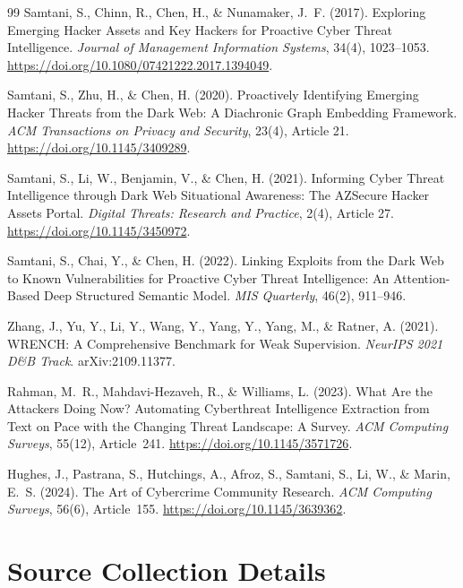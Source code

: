 \documentclass{article}
\begin{document}
\begin{thebibliography}{99}
Samtani, S., Chinn, R., Chen, H., \& Nunamaker, J.\ F. (2017).
Exploring Emerging Hacker Assets and Key Hackers for Proactive Cyber
Threat Intelligence. \textit{Journal of Management Information Systems},
34(4), 1023--1053. \url{https://doi.org/10.1080/07421222.2017.1394049}.

Samtani, S., Zhu, H., \& Chen, H. (2020).
Proactively Identifying Emerging Hacker Threats from the Dark Web: A
Diachronic Graph Embedding Framework. \textit{ACM Transactions on Privacy
and Security}, 23(4), Article 21. \url{https://doi.org/10.1145/3409289}.

Samtani, S., Li, W., Benjamin, V., \& Chen, H. (2021).
Informing Cyber Threat Intelligence through Dark Web Situational
Awareness: The AZSecure Hacker Assets Portal. \textit{Digital Threats:
Research and Practice}, 2(4), Article 27.
\url{https://doi.org/10.1145/3450972}.

Samtani, S., Chai, Y., \& Chen, H. (2022).
Linking Exploits from the Dark Web to Known Vulnerabilities for Proactive
Cyber Threat Intelligence: An Attention-Based Deep Structured Semantic
Model. \textit{MIS Quarterly}, 46(2), 911--946.

Zhang, J., Yu, Y., Li, Y., Wang, Y., Yang, Y., Yang, M., \&
Ratner, A. (2021). WRENCH: A Comprehensive Benchmark for Weak
Supervision. \textit{NeurIPS 2021 D\&B Track}. arXiv:2109.11377.

Rahman, M.\ R., Mahdavi-Hezaveh, R., \& Williams, L. (2023).
What Are the Attackers Doing Now? Automating Cyberthreat Intelligence
Extraction from Text on Pace with the Changing Threat Landscape: A Survey.
\textit{ACM Computing Surveys}, 55(12), Article~241.
\url{https://doi.org/10.1145/3571726}.

Hughes, J., Pastrana, S., Hutchings, A., Afroz, S., Samtani, S.,
Li, W., \& Marin, E.\ S. (2024).
The Art of Cybercrime Community Research.
\textit{ACM Computing Surveys}, 56(6), Article~155.
\url{https://doi.org/10.1145/3639362}.

\end{thebibliography}

\appendix

\section{Source Collection Details}
\label{app:collection}
\end{document}

